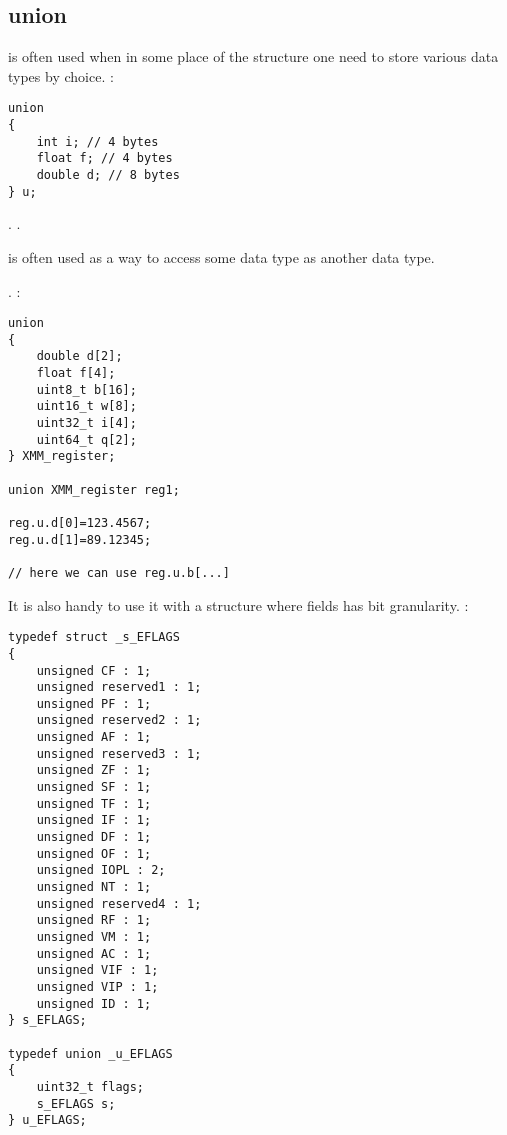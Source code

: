 ﻿\subsection{union}

 
{is often used when in some place of the structure one need to store various data types by choice}.
:

\begin{lstlisting}
union
{
	int i; // 4 bytes
	float f; // 4 bytes
	double d; // 8 bytes
} u;
\end{lstlisting}

  .
.

 
{is often used as a way to access some data type as another data type}.

.
:

\begin{lstlisting}
union
{
	double d[2];
	float f[4];
	uint8_t b[16];
	uint16_t w[8];
	uint32_t i[4];
	uint64_t q[2];
} XMM_register;

union XMM_register reg1;

reg.u.d[0]=123.4567;
reg.u.d[1]=89.12345;

// here we can use reg.u.b[...]

\end{lstlisting}

{It is also handy to use it with a structure where fields has bit granularity}.
:

\begin{lstlisting}
typedef struct _s_EFLAGS
{
    unsigned CF : 1;
    unsigned reserved1 : 1;
    unsigned PF : 1;
    unsigned reserved2 : 1;
    unsigned AF : 1;
    unsigned reserved3 : 1;
    unsigned ZF : 1;
    unsigned SF : 1;
    unsigned TF : 1;
    unsigned IF : 1;
    unsigned DF : 1;
    unsigned OF : 1;
    unsigned IOPL : 2;
    unsigned NT : 1;
    unsigned reserved4 : 1;
    unsigned RF : 1;
    unsigned VM : 1;
    unsigned AC : 1;
    unsigned VIF : 1;
    unsigned VIP : 1;
    unsigned ID : 1;
} s_EFLAGS;

typedef union _u_EFLAGS
{
    uint32_t flags;
    s_EFLAGS s;
} u_EFLAGS;
\end{lstlisting}

